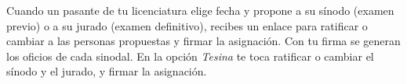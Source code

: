\documentclass[11pt,a4paper]{article}
\begin{document}
{\small\tableofcontents}
\newpage
\begin{quevasahacer}
Cuando un pasante de tu licenciatura elige fecha y propone a su sínodo (examen previo) o a su jurado (examen definitivo), recibes un enlace para ratificar o cambiar a las personas propuestas y firmar la asignación. Con tu firma se generan los oficios de cada sinodal. En la opción \emph{Tesina} te toca ratificar o cambiar el sínodo y el jurado, y firmar la asignación.
\end{quevasahacer}



\end{document}
